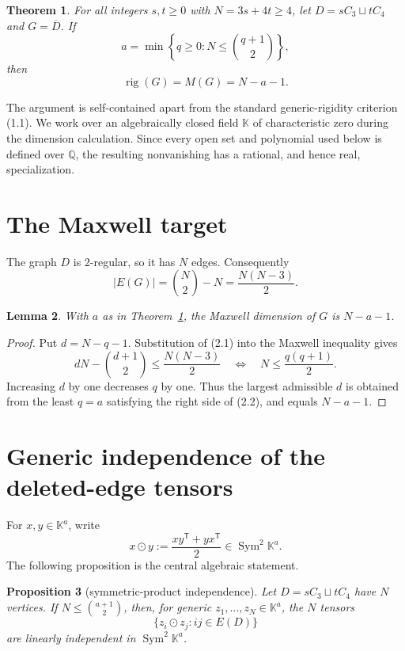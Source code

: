 \documentclass[11pt]{article}
\newtheorem{theorem}{Theorem}[section]
\newtheorem{proposition}[theorem]{Proposition}
\newtheorem{lemma}[theorem]{Lemma}
\newcommand{\K}{\mathbb{K}}
\newcommand{\Sym}{\operatorname{Sym}}
\newcommand{\rig}{\operatorname{rig}}
\begin{document}
\begin{theorem}\label{thm:main}
For all integers $s,t\geq0$ with $N=3s+4t\geq4$, let
$D=sC_3\sqcup tC_4$ and $G=\overline D$.  If
\[
 a=\min\left\{q\geq0:N\leq\binom{q+1}{2}\right\},
\]
then
\[
 \rig(G)=M(G)=N-a-1.
\]
\end{theorem}

The argument is self-contained apart from the standard generic-rigidity
criterion (1.1).  We work over an algebraically closed field $\K$ of
characteristic zero during the dimension calculation.  Since every open set
and polynomial used below is defined over $\mathbb Q$, the resulting
nonvanishing has a rational, and hence real, specialization.

\section{The Maxwell target}

The graph $D$ is $2$-regular, so it has $N$ edges.  Consequently
\[
 |E(G)|=\binom N2-N=\frac{N(N-3)}2.
 \tag{2.1}
\]

\begin{lemma}\label{lem:maxwell}
With $a$ as in Theorem~\ref{thm:main}, the Maxwell dimension of $G$ is
$N-a-1$.
\end{lemma}

\begin{proof}
Put $d=N-q-1$.  Substitution of (2.1) into the Maxwell inequality gives
\[
 dN-\binom{d+1}{2}\leq\frac{N(N-3)}2
 \quad\Longleftrightarrow\quad
 N\leq\frac{q(q+1)}2.
 \tag{2.2}
\]
Increasing $d$ by one decreases $q$ by one.  Thus the largest admissible
$d$ is obtained from the least $q=a$ satisfying the right side of (2.2),
and equals $N-a-1$.
\end{proof}

\section{Generic independence of the deleted-edge tensors}

For $x,y\in\K^a$, write
\[
 x\odot y:=\frac{xy^{\mathsf T}+yx^{\mathsf T}}2\in\Sym^2\K^a.
\]
The following proposition is the central algebraic statement.

\begin{proposition}[symmetric-product independence]\label{prop:compression}
Let $D=sC_3\sqcup tC_4$ have $N$ vertices.  If
$N\leq\binom{a+1}{2}$, then, for generic
$z_1,\ldots,z_N\in\K^a$, the $N$ tensors
\[
 \{z_i\odot z_j:ij\in E(D)\}
 \tag{3.1}
\]
are linearly independent in $\Sym^2\K^a$.
\end{proposition}
\end{document}
